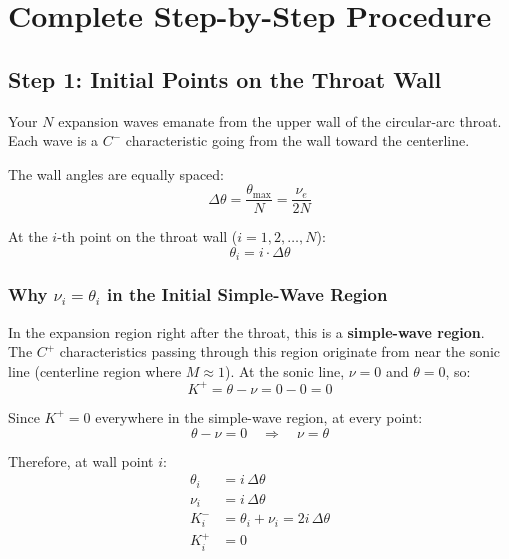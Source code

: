 \documentclass[11pt]{article}
\begin{document}
\section{Complete Step-by-Step Procedure}

\subsection{Step 1: Initial Points on the Throat Wall}

Your $N$ expansion waves emanate from the upper wall of the circular-arc throat. Each wave is a $C^-$ characteristic going from the wall toward the centerline.

The wall angles are equally spaced:
\begin{equation}
    \Delta\theta = \frac{\theta_{\max}}{N} = \frac{\nu_e}{2N}
\end{equation}

At the $i$-th point on the throat wall ($i = 1, 2, \ldots, N$):
\begin{equation}
    \theta_i = i \cdot \Delta\theta
\end{equation}

\subsubsection{Why $\nu_i = \theta_i$ in the Initial Simple-Wave Region}

In the expansion region right after the throat, this is a \textbf{simple-wave region}. The $C^+$ characteristics passing through this region originate from near the sonic line (centerline region where $M \approx 1$). At the sonic line, $\nu = 0$ and $\theta = 0$, so:
\begin{equation}
    K^+ = \theta - \nu = 0 - 0 = 0
\end{equation}

Since $K^+ = 0$ everywhere in the simple-wave region, at every point:
\begin{equation}
    \theta - \nu = 0 \quad \Longrightarrow \quad \boxed{\nu = \theta}
\end{equation}

Therefore, at wall point $i$:
\begin{align}
    \theta_i &= i\,\Delta\theta \\
    \nu_i &= i\,\Delta\theta \\
    K^-_i &= \theta_i + \nu_i = 2i\,\Delta\theta \\
    K^+_i &= 0
\end{align}
\end{document}
